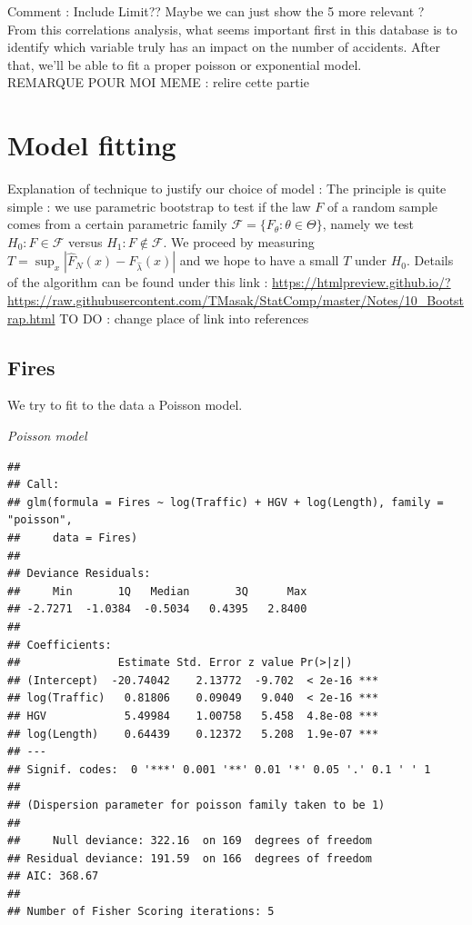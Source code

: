 \documentclass[
]{article}
\begin{document}
Comment : Include Limit?? Maybe we can just show the 5 more relevant ?\\

From this correlations analysis, what seems important first in this
database is to identify which variable truly has an impact on the number
of accidents. After that, we'll be able to fit a proper poisson or
exponential model.\\

REMARQUE POUR MOI MEME : relire cette partie

\hypertarget{model-fitting}{%
\section{Model fitting}\label{model-fitting}}

Explanation of technique to justify our choice of model : The principle
is quite simple : we use parametric bootstrap to test if the law \(F\)
of a random sample comes from a certain parametric family
\(\mathcal{F}=\{F_\theta : \theta \in \Theta\}\), namely we test
\(H_0:F\in \mathcal{F}\) versus \(H_1: F \notin \mathcal{F}\). We
proceed by measuring \(T= \sup_{x} |\hat{F}_N(x)-F_{\hat{\lambda}}(x)|\)
and we hope to have a small \(T\) under \(H_0\). Details of the
algorithm can be found under this link :
\url{https://htmlpreview.github.io/?https://raw.githubusercontent.com/TMasak/StatComp/master/Notes/10_Bootstrap.html}
TO DO : change place of link into references

\hypertarget{fires}{%
\subsection{Fires}\label{fires}}

We try to fit to the data a Poisson model.

\emph{Poisson model}

\begin{verbatim}
## 
## Call:
## glm(formula = Fires ~ log(Traffic) + HGV + log(Length), family = "poisson", 
##     data = Fires)
## 
## Deviance Residuals: 
##     Min       1Q   Median       3Q      Max  
## -2.7271  -1.0384  -0.5034   0.4395   2.8400  
## 
## Coefficients:
##               Estimate Std. Error z value Pr(>|z|)    
## (Intercept)  -20.74042    2.13772  -9.702  < 2e-16 ***
## log(Traffic)   0.81806    0.09049   9.040  < 2e-16 ***
## HGV            5.49984    1.00758   5.458  4.8e-08 ***
## log(Length)    0.64439    0.12372   5.208  1.9e-07 ***
## ---
## Signif. codes:  0 '***' 0.001 '**' 0.01 '*' 0.05 '.' 0.1 ' ' 1
## 
## (Dispersion parameter for poisson family taken to be 1)
## 
##     Null deviance: 322.16  on 169  degrees of freedom
## Residual deviance: 191.59  on 166  degrees of freedom
## AIC: 368.67
## 
## Number of Fisher Scoring iterations: 5
\end{verbatim}
\end{document}

